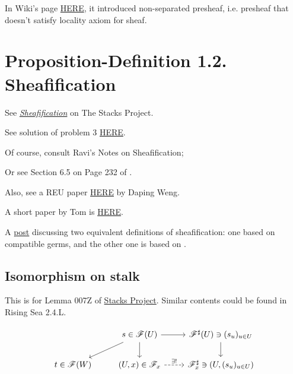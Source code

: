 In Wiki's page \href{https://en.wikipedia.org/wiki/Sheaf_(mathematics)}{HERE}, it introduced non-separated presheaf, i.e. presheaf that doesn't satisfy locality axiom for sheaf.

\section{Proposition-Definition 1.2. Sheafification}

See \href{https://stacks.math.columbia.edu/tag/007X}{\textit{Sheafification}} on The Stacks Project.

See solution of problem 3 \href{https://www2.math.ethz.ch/education/bachelor/lectures/fs2016/math/alg_geom/Solution11.pdf}{HERE}.

Of course, consult Ravi's Notes on Sheafification; 

Or see Section 6.5 on Page 232 of \cite{bosch2013algebraic}.

Also, see a REU paper \href{http://www.math.uchicago.edu/%7Emay/VIGRE/VIGRE2011/REUPapers/WengD.pdf}{HERE} by Daping Weng.

A short paper by Tom is \href{https://www.maths.ed.ac.uk/~tl/sheaves.pdf}{HERE}.

A \href{https://math.stackexchange.com/questions/889497/sheafification-definition}{post} discussing two equivalent definitions of sheafification: one based on compatible germs, and the other one is based on .

\subsection{Isomorphism on stalk}

This is for Lemma 007Z of \href{https://stacks.math.columbia.edu/tag/007X}{Stacks Project}. Similar contents could be found in Rising Sea 2.4.L.

\[\begin{tikzcd}
	& {s\in\mathscr F(U)} & {\mathscr F^{\sharp}(U)\ni (s_u)_{u\in U}} \\
	{t\in\mathscr F(W)} & {(U,x)\in \mathscr F_x} & {\mathscr F_x^{\sharp}\ni (U,(s_u)_{u\in U})}
	\arrow[from=1-2, to=1-3]
	\arrow[from=1-2, to=2-2]
	\arrow[from=1-3, to=2-3]
	\arrow["{\exists !}", dashed, from=2-2, to=2-3]
	\arrow[from=1-2, to=2-1]
\end{tikzcd}\]

